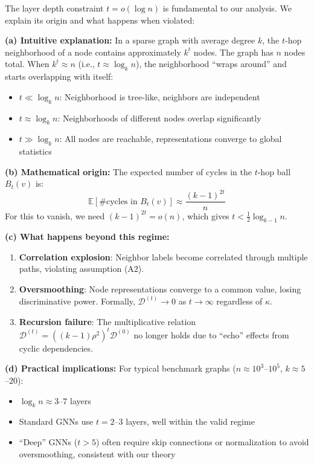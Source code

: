 \begin{remark}[Why $t = o(\log n)$: Intuition and Consequences]
\label{rem:t_constraint_intuition}
The layer depth constraint $t = o(\log n)$ is fundamental to our analysis. We explain its origin and what happens when violated:

\textbf{(a) Intuitive explanation:}
In a sparse graph with average degree $k$, the $t$-hop neighborhood of a node contains approximately $k^t$ nodes. The graph has $n$ nodes total. When $k^t \approx n$ (i.e., $t \approx \log_k n$), the neighborhood ``wraps around'' and starts overlapping with itself:
\begin{itemize}
    \item $t \ll \log_k n$: Neighborhood is tree-like, neighbors are independent
    \item $t \approx \log_k n$: Neighborhoods of different nodes overlap significantly
    \item $t \gg \log_k n$: All nodes are reachable, representations converge to global statistics
\end{itemize}

\textbf{(b) Mathematical origin:}
The expected number of cycles in the $t$-hop ball $B_t(v)$ is:
\begin{equation}
    \mathbb{E}[\#\text{cycles in } B_t(v)] \approx \frac{(k-1)^{2t}}{n}
\end{equation}
For this to vanish, we need $(k-1)^{2t} = o(n)$, which gives $t < \frac{1}{2}\log_{k-1} n$.

\textbf{(c) What happens beyond this regime:}
\begin{enumerate}
    \item \textbf{Correlation explosion}: Neighbor labels become correlated through multiple paths, violating assumption (A2).
    \item \textbf{Oversmoothing}: Node representations converge to a common value, losing discriminative power. Formally, $\mathcal{D}^{(t)} \to 0$ as $t \to \infty$ regardless of $\kappa$.
    \item \textbf{Recursion failure}: The multiplicative relation $\mathcal{D}^{(t)} = ((k-1)\rho^2)^t \mathcal{D}^{(0)}$ no longer holds due to ``echo'' effects from cyclic dependencies.
\end{enumerate}

\textbf{(d) Practical implications:}
For typical benchmark graphs ($n \approx 10^3$--$10^5$, $k \approx 5$--$20$):
\begin{itemize}
    \item $\log_k n \approx 3$--$7$ layers
    \item Standard GNNs use $t = 2$--$3$ layers, well within the valid regime
    \item ``Deep'' GNNs ($t > 5$) often require skip connections or normalization to avoid oversmoothing, consistent with our theory
\end{itemize}
\end{remark}

